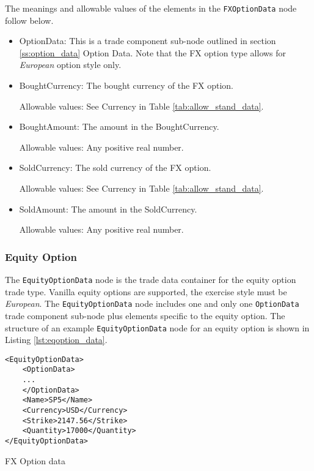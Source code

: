 The meanings and allowable values of the elements in the \lstinline!FXOptionData!  node follow below.

\begin{itemize}
\item OptionData: This is a trade component sub-node outlined in section \ref{ss:option_data} Option Data. Note that the
  FX option type allows for \emph{European} option style only.

\item BoughtCurrency: The bought currency of the FX option.  

Allowable values:  See Currency in Table \ref{tab:allow_stand_data}.

\item BoughtAmount: The amount in the BoughtCurrency.  

Allowable values:  Any positive real number.

\item SoldCurrency: The sold currency of the FX option.  

Allowable values:  See Currency in Table \ref{tab:allow_stand_data}.

\item SoldAmount: The amount in the SoldCurrency.  

Allowable values:  Any positive real number.

\end{itemize}

\subsubsection{Equity Option}

The \lstinline!EquityOptionData!  node is the trade data container for the equity option trade type.  Vanilla equity 
options are supported, the exercise style must be \emph{European}. The \lstinline!EquityOptionData!  node includes one and 
only one \lstinline!OptionData! trade component sub-node plus elements specific to the equity option. The structure of 
an example \lstinline!EquityOptionData! node for an equity option is shown in Listing
\ref{lst:eqoption_data}.

\begin{listing}[H]
\begin{verbatim}
<EquityOptionData>
	<OptionData>
	...
	</OptionData>
	<Name>SP5</Name>
	<Currency>USD</Currency>
	<Strike>2147.56</Strike>
	<Quantity>17000</Quantity>
</EquityOptionData>
\end{verbatim}
\caption{FX Option data}
\label{lst:eqoption_data}
\end{listing}

